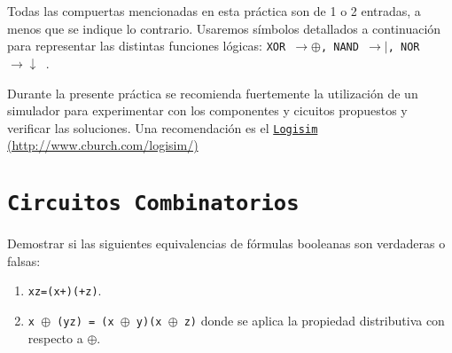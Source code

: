 Todas las compuertas mencionadas en esta práctica son de 1 o 2 entradas, a menos que se indique lo contrario.
Usaremos símbolos detallados a continuación para representar las distintas funciones lógicas:
{\tt XOR $\to \oplus$, NAND $\to |$, NOR $\to \downarrow$   }.\par
Durante la presente práctica se recomienda fuertemente la utilización de un simulador para experimentar con
los componentes y cicuitos propuestos y verificar las soluciones. Una recomendación es el \href{http://www.cburch.com/logisim}{\texttt{Logisim} (http://www.cburch.com/logisim/)}\par\bigskip

\section*{\tt Circuitos Combinatorios}

\begin{enunciado}{\ejercicio}
  Demostrar si las siguientes equivalencias de fórmulas booleanas son verdaderas o falsas:
  \begin{enumerate}[label=\tt\alph*)]
    \item {\tt x\por z=(x+)\por (+z)}.
    \item {\tt x $\oplus$ (y\por z) = (x $\oplus$ y)\por (x $\oplus$ z)} donde se aplica la propiedad distributiva con respecto a $\oplus$.
  \end{enumerate}
\end{enunciado}

